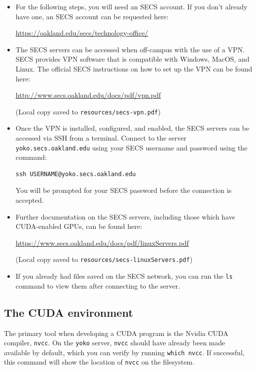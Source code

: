 \documentclass{article}
\newcommand{\resource}[1]{(Local copy saved to \texttt{#1})}
\theoremstyle{definition}
\begin{document}
\begin{itemize}
\item 
For the following steps, you will need an SECS account. If you don't already have one, an SECS account can be requested here:

\url{https://oakland.edu/secs/technology-office/}

\item 
The SECS servers can be accessed when off-campus with the use of a VPN. SECS provides VPN software that is compatible with Windows, MacOS, and Linux. The official SECS instructions on how to set up the VPN can be found here:
    
\url{http://www.secs.oakland.edu/docs/pdf/vpn.pdf}

\resource{resources/secs-vpn.pdf}
    
\item 
Once the VPN is installed, configured, and enabled, the SECS servers can be accessed via SSH from a terminal. Connect to the server \texttt{yoko.secs.oakland.edu} using your SECS username and password using the command: 
\begin{verbatim}ssh USERNAME@yoko.secs.oakland.edu\end{verbatim}
You will be prompted for your SECS password before the connection is accepted.

\item 
Further documentation on the SECS servers, including those which have CUDA-enabled GPUs, can be found here:

\url{https://www.secs.oakland.edu/docs/pdf/linuxServers.pdf}

\resource{resources/secs-linuxServers.pdf}

\item 
If you already had files saved on the SECS network, you can run the \texttt{ls} command to view them after connecting to the server. 
\end{itemize}

\subsection{The CUDA environment}

The primary tool when developing a CUDA program is the Nvidia CUDA compiler, \texttt{nvcc}. On the \texttt{yoko} server, \texttt{nvcc} should have already been made available by default, which you can verify by running \texttt{which nvcc}. If successful, this command will show the location of \texttt{nvcc} on the filesystem.
\end{document}
